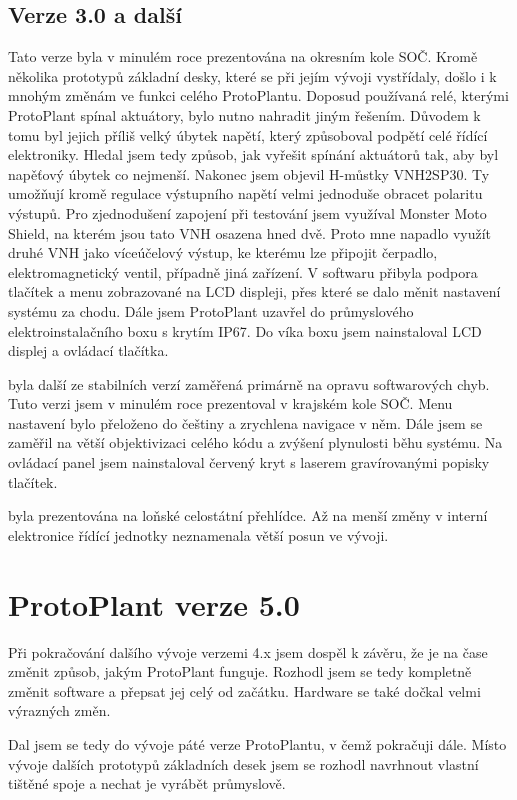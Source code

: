 \subsection{Verze 3.0 a další}
Tato verze byla v minulém roce prezentována na okresním kole SOČ.
Kromě několika prototypů základní desky, které se při jejím vývoji vystřídaly, došlo i k mnohým změnám ve funkci celého ProtoPlantu.
Doposud používaná relé, kterými ProtoPlant spínal aktuátory, bylo nutno nahradit jiným řešením.
Důvodem k tomu byl jejich příliš velký úbytek napětí, který způsoboval podpětí celé řídící elektroniky.
Hledal jsem tedy způsob, jak vyřešit spínání aktuátorů tak, aby byl napěťový úbytek co nejmenší.
Nakonec jsem objevil H-můstky VNH2SP30. 
Ty umožňují kromě regulace výstupního napětí velmi jednoduše obracet polaritu výstupů.
Pro zjednodušení zapojení při testování jsem využíval Monster Moto Shield, na kterém jsou tato VNH osazena hned dvě.
Proto mne napadlo využít druhé VNH jako víceúčelový výstup, ke kterému lze připojit čerpadlo, elektromagnetický ventil, případně jiná zařízení.
V softwaru přibyla podpora tlačítek a menu zobrazované na LCD displeji, přes které se dalo měnit nastavení systému za chodu.
Dále jsem ProtoPlant uzavřel do průmyslového elektroinstalačního boxu s krytím IP67.
Do víka boxu jsem nainstaloval LCD displej a ovládací tlačítka.
\newline

\noindent{} byla další ze stabilních verzí zaměřená primárně na opravu softwarových chyb.
Tuto verzi jsem v minulém roce prezentoval v krajském kole SOČ.
Menu nastavení bylo přeloženo do češtiny a zrychlena navigace v něm.
Dále jsem se zaměřil na větší objektivizaci celého kódu a zvýšení plynulosti běhu systému.
Na ovládací panel jsem nainstaloval červený kryt s laserem gravírovanými popisky tlačítek.
\newline

\noindent{} byla prezentována na loňské celostátní přehlídce.
Až na menší změny v interní elektronice řídící jednotky neznamenala větší posun ve vývoji.

\section{ProtoPlant verze 5.0}
Při pokračování dalšího vývoje verzemi 4.x jsem dospěl k závěru, že je na čase změnit způsob, jakým ProtoPlant funguje.
Rozhodl jsem se tedy kompletně změnit software a přepsat jej celý od začátku.
Hardware se také dočkal velmi výrazných změn.

Dal jsem se tedy do vývoje páté verze ProtoPlantu, v čemž pokračuji dále.
Místo vývoje dalších prototypů základních desek jsem se rozhodl navrhnout vlastní tištěné spoje a nechat je vyrábět průmyslově.

\newpage
